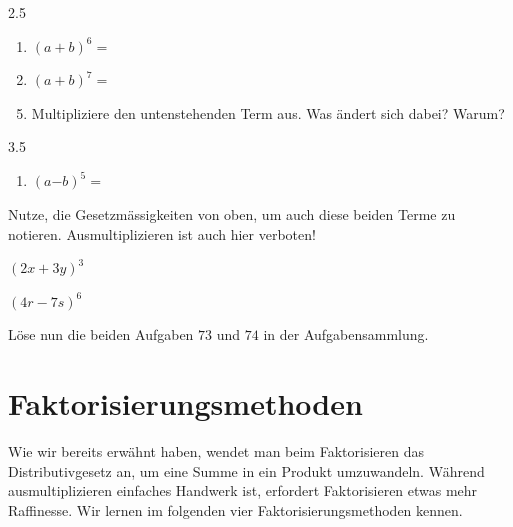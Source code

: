 \documentclass[11pt,oneside]{article}
\begin{document}
\begin{aufgabe}
\begin{enumerate}
        \end{enumerate}
        \begin{gridspace}{2.5}
           	\begin{enumerate}[label=\ ,leftmargin=1.1cm]
           		\item $(a+b)^6=$
           		\item $(a+b)^7=$
           	\end{enumerate}
        \end{gridspace}
        \begin{enumerate}
        	\setcounter{enumi}{4}
        	\item Multipliziere den untenstehenden Term aus. Was ändert sich dabei? Warum?
    	\end{enumerate}
    	\begin{gridspace}{3.5}
    		\begin{enumerate}[label=\ ,leftmargin=1.1cm]
    		\item $(a\mathbf{-}b)^5=$
    		\end{enumerate}
    	\end{gridspace}
    \end{aufgabe}
    \begin{aufgabe}
        Nutze, die Gesetzmässigkeiten von oben, um auch diese beiden Terme zu notieren. Ausmultiplizieren ist auch hier verboten!
        \begin{enumcols}[2]
            \item $(2x+3y)^3$
            \item $(4r-7s)^6$
        \end{enumcols}
        Löse nun die beiden Aufgaben $73$ und $74$ in der Aufgabensammlung.
    \end{aufgabe}


\newpage
\section{Faktorisierungsmethoden}
    Wie wir bereits erwähnt haben, wendet man beim Faktorisieren das Distributivgesetz an, um eine Summe in ein Produkt umzuwandeln. Während ausmultiplizieren \glqq einfaches Handwerk\grqq\: ist, erfordert Faktorisieren etwas mehr Raffinesse. Wir lernen im folgenden vier Faktorisierungsmethoden kennen.
\end{document}
